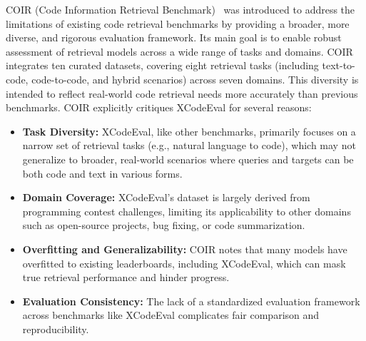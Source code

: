 \documentclass[12pt]{article}
\begin{document}
COIR (Code Information Retrieval Benchmark)~\cite{Li2025} was introduced to address the limitations of existing code retrieval benchmarks by providing a broader, more diverse, and rigorous evaluation framework. Its main goal is to enable robust assessment of retrieval models across a wide range of tasks and domains. COIR integrates ten curated datasets, covering eight retrieval tasks (including text-to-code, code-to-code, and hybrid scenarios) across seven domains. This diversity is intended to reflect real-world code retrieval needs more accurately than previous benchmarks. COIR explicitly critiques XCodeEval for several reasons:
\begin{itemize}
    \item \textbf{Task Diversity:} XCodeEval, like other benchmarks, primarily focuses on a narrow set of retrieval tasks (e.g., natural language to code), which may not generalize to broader, real-world scenarios where queries and targets can be both code and text in various forms.
    \item \textbf{Domain Coverage:} XCodeEval's dataset is largely derived from programming contest challenges, limiting its applicability to other domains such as open-source projects, bug fixing, or code summarization.
    \item \textbf{Overfitting and Generalizability:} COIR notes that many models have overfitted to existing leaderboards, including XCodeEval, which can mask true retrieval performance and hinder progress.
    \item \textbf{Evaluation Consistency:} The lack of a standardized evaluation framework across benchmarks like XCodeEval complicates fair comparison and reproducibility.
\end{itemize}
  
\end{document}
